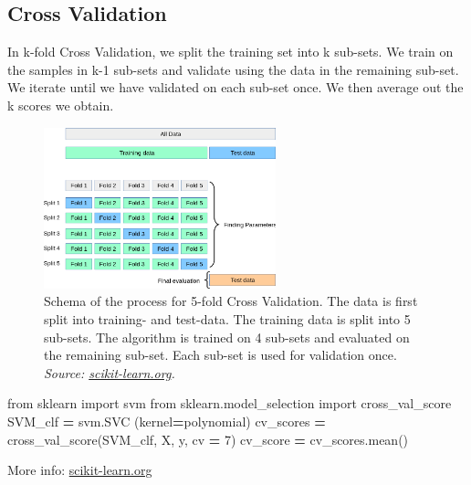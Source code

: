 \documentclass[
]{book}
\newenvironment{Shaded}{\begin{snugshade}}{\end{snugshade}}
\newcommand{\DecValTok}[1]{\textcolor[rgb]{0.00,0.00,0.81}{#1}}
\newcommand{\ImportTok}[1]{#1}
\newcommand{\NormalTok}[1]{#1}
\newcommand{\OperatorTok}[1]{\textcolor[rgb]{0.81,0.36,0.00}{\textbf{#1}}}
\newcommand{\StringTok}[1]{\textcolor[rgb]{0.31,0.60,0.02}{#1}}
\begin{document}
\hypertarget{crossval}{%
\subsection{Cross Validation}\label{crossval}}

In k-fold Cross Validation, we split the training set into k sub-sets.
We train on the samples in k-1 sub-sets and validate using the data in
the remaining sub-set. We iterate until we have validated on each
sub-set once. We then average out the k scores we obtain.

\begin{figure}
\centering
\includegraphics[width=0.6\textwidth,height=\textheight]{figures/cross_validation.png}
\caption{Schema of the process for 5-fold Cross Validation. The data is first
split into training- and test-data. The training data is split into 5
sub-sets. The algorithm is trained on 4 sub-sets and evaluated on the
remaining sub-set. Each sub-set is used for validation once. \emph{Source:
\href{https://scikit-learn.org/stable/modules/cross_validation.html}{scikit-learn.org}.}}
\end{figure}

\begin{Shaded}
\begin{Highlighting}[]
\ImportTok{from}\NormalTok{ sklearn }\ImportTok{import}\NormalTok{ svm}
\ImportTok{from}\NormalTok{ sklearn.model\_selection }\ImportTok{import}\NormalTok{ cross\_val\_score}
\NormalTok{SVM\_clf }\OperatorTok{=}\NormalTok{ svm.SVC (kernel}\OperatorTok{=}\StringTok{\textquotesingle{}polynomial\textquotesingle{}}\NormalTok{)}
\NormalTok{cv\_scores }\OperatorTok{=}\NormalTok{ cross\_val\_score(SVM\_clf, X, y, cv }\OperatorTok{=} \DecValTok{7}\NormalTok{)}
\NormalTok{cv\_score }\OperatorTok{=}\NormalTok{ cv\_scores.mean()}
\end{Highlighting}
\end{Shaded}

More info:
\href{https://scikit-learn.org/stable/modules/cross_validation.html\#computing-cross-validated-metrics}{scikit-learn.org}
\end{document}
